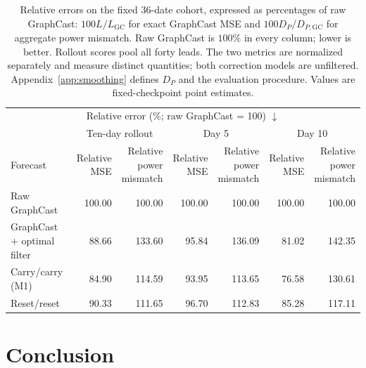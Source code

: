 \documentclass{article}
\newcommand{\vfourred}[1]{{\color{red}#1}}
\begin{document}
\begin{table}[!htbp]
    \centering
    \begingroup\color{red}\small
    \setlength{\tabcolsep}{4pt}
    \begin{tabular}{lrrrrrr}
        \toprule
        \multicolumn{7}{c}{Relative error (\%; raw GraphCast = 100) $\downarrow$} \\
        \addlinespace[2pt]
        & \multicolumn{2}{c}{Ten-day rollout} & \multicolumn{2}{c}{Day 5} & \multicolumn{2}{c}{Day 10} \\
        \cmidrule(lr){2-3}\cmidrule(lr){4-5}\cmidrule(lr){6-7}
        Forecast & \shortstack{Relative\\MSE} & \shortstack{Relative\\power\\mismatch} & \shortstack{Relative\\MSE} & \shortstack{Relative\\power\\mismatch} & \shortstack{Relative\\MSE} & \shortstack{Relative\\power\\mismatch} \\
        \midrule
        Raw GraphCast & 100.00 & 100.00 & 100.00 & 100.00 & 100.00 & 100.00 \\
        GraphCast + optimal filter & 88.66 & 133.60 & 95.84 & 136.09 & 81.02 & 142.35 \\
        Carry/carry (M1) & 84.90 & 114.59 & 93.95 & 113.65 & 76.58 & 130.61 \\
        Reset/reset & 90.33 & 111.65 & 96.70 & 112.83 & 85.28 & 117.11 \\
        \bottomrule
    \end{tabular}
    \endgroup
    \caption{\vfourred{Relative errors on the fixed 36-date cohort, expressed as percentages of raw GraphCast: $100L/L_{\mathrm{GC}}$ for exact GraphCast MSE and $100D_P/D_{P,\mathrm{GC}}$ for aggregate power mismatch. Raw GraphCast is $100\%$ in every column; lower is better. Rollout scores pool all forty leads. The two metrics are normalized separately and measure distinct quantities; both correction models are unfiltered. Appendix~\ref{app:smoothing} defines $D_P$ and the evaluation procedure. Values are fixed-checkpoint point estimates.}}
    \label{tab:smoothing_scores}
\end{table}

\FloatBarrier
\section{Conclusion}
\end{document}
